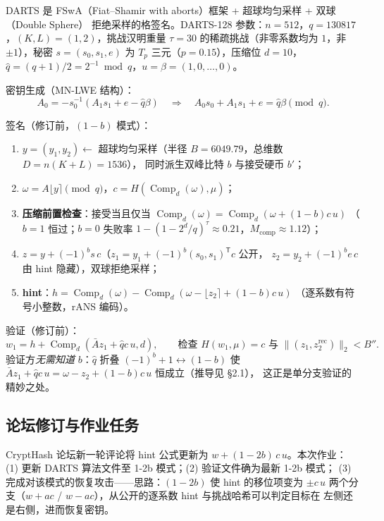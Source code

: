 \documentclass[UTF8,11pt,a4paper]{ctexart}
\newcommand{\Comp}{\operatorname{Comp}}
\begin{document}
DARTS 是 FSwA（Fiat--Shamir with aborts）框架 + 超球均匀采样 + 双球（Double Sphere）
拒绝采样的格签名。DARTS-128 参数：$n=512$，$q=130817$，$(K,L)=(1,2)$，挑战汉明重量
$\tau=30$ 的稀疏挑战（非零系数均为 $1$，非 $\pm1$），秘密 $s=(s_0,s_1,e)$ 为 $T_p$ 三元（$p=0.15$），压缩位 $d=10$，
$\hat q=(q+1)/2=2^{-1}\bmod q$，$u=\beta=(1,0,\dots,0)$。

密钥生成（MN-LWE 结构）：
\begin{equation}
A_0=-s_0^{-1}\!\left(A_1s_1+e-\hat q\beta\right)
\quad\Longrightarrow\quad
A_0s_0+A_1s_1+e=\hat q\beta \pmod q.\tag{$\ast$}\label{eq:keyid}
\end{equation}

签名（修订前，$(1-b)$ 模式）：
\begin{enumerate}
\item $y=(y_1,y_2)\leftarrow$ 超球均匀采样（半径 $B=6049.79$，总维数 $D=n(K{+}L)=1536$），
      同时派生双峰比特 $b$ 与接受硬币 $b'$；
\item $\omega=A\lfloor y\rceil \pmod q$，$c=H(\Comp_d(\omega),\mu)$；
\item \textbf{压缩前置检查}：接受当且仅当
      $\Comp_d(\omega)=\Comp_d(\omega+(1-b)c\,u)$
      （$b{=}1$ 恒过；$b{=}0$ 失败率 $1-(1-2^d/q)^\tau\approx 0.21$，$M_{\mathrm{comp}}\approx1.12$）；
\item $z=y+(-1)^b s\,c$（$z_1=y_1+(-1)^b(s_0,s_1)^{\mathsf T}c$ 公开，
      $z_2=y_2+(-1)^b e\,c$ 由 hint 隐藏），双球拒绝采样；
\item \textbf{hint}：$h=\Comp_d(\omega)-\Comp_d\!\left(\omega-\lfloor z_2\rceil+(1-b)c\,u\right)$
      （逐系数有符号小整数，rANS 编码）。
\end{enumerate}

验证（修订前）：
\begin{equation*}
w_1=h+\Comp_d(\bar A z_1+\hat q c\,u,d),\qquad
\text{检查 } H(w_1,\mu)=c \text{ 与 } \bigl\|(z_1,z_2^{\mathrm{rec}})\bigr\|_2<B'' .
\end{equation*}
验证方\emph{无需知道} $b$：$\hat q$ 折叠 $(-1)^b+1\leftrightarrow(1-b)$ 使
$\bar Az_1+\hat qc\,u=\omega-z_2+(1-b)c\,u$ 恒成立（推导见 \S2.1），
这正是单分支验证的精妙之处。

\subsection{论坛修订与作业任务}

CryptHash 论坛新一轮评论将 hint 公式更新为 $w+(1-2b)\,c\,u$。本次作业：
(1) 更新 DARTS 算法文件至 1-2b 模式；(2) 验证文件确为最新 1-2b 模式；
(3) 完成对该模式的恢复攻击——思路：$(1{-}2b)$ 使 hint 的移位项变为 $\pm c\,u$
两个分支（$w{+}ac$ / $w{-}ac$），从公开的逐系数 hint 与挑战哈希可以判定目标在
左侧还是右侧，进而恢复密钥。
\end{document}

